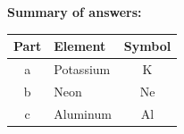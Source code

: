 \begin{exercise}
\begin{solu}
        \textbf{Summary of answers:}
        \begin{center}
            \begin{tabular}{@{}clc@{}}
                \toprule
                \textbf{Part} & \textbf{Element} & \textbf{Symbol} \\
                \midrule
                a & Potassium & K \\[3pt]
                b & Neon & Ne \\[3pt]
                c & Aluminum & Al \\[3pt]

\end{tabular}
\end{center}
\end{solu}
\end{exercise}
